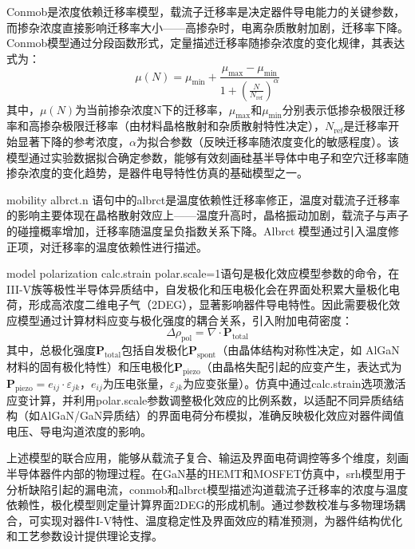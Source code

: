 \documentclass[
    oneside,                %
    fontset = win, %
  ]{njuthesis}
\begin{document}
Conmob是浓度依赖迁移率模型，载流子迁移率是决定器件导电能力的关键参数，而掺杂浓度直接影响迁移率大小——高掺杂时，电离杂质散射加剧，迁移率下降\cite{HighFieldTransportSemiconductors}。Conmob模型通过分段函数形式，定量描述迁移率随掺杂浓度的变化规律，其表达式为：
\begin{equation}
\mu(N) = \mu_{\text{min}} + \frac{\mu_{\text{max}} - \mu_{\text{min}}}{1 + \left(\frac{N}{N_{\text{ref}}}\right)^\alpha}
\end{equation}
其中，\(\mu(N)\)为当前掺杂浓度N下的迁移率，\(\mu_{\text{max}}\)和\(\mu_{\text{min}}\)分别表示低掺杂极限迁移率和高掺杂极限迁移率（由材料晶格散射和杂质散射特性决定），\(N_{\text{ref}}\)是迁移率开始显著下降的参考浓度，\(\alpha\)为拟合参数（反映迁移率随浓度变化的敏感程度）。该模型通过实验数据拟合确定参数，能够有效刻画硅基半导体中电子和空穴迁移率随掺杂浓度的变化趋势，是器件电导特性仿真的基础模型之一。

mobility albrct.n 语句中的albrct是温度依赖性迁移率修正，温度对载流子迁移率的影响主要体现在晶格散射效应上——温度升高时，晶格振动加剧，载流子与声子的碰撞概率增加，迁移率随温度呈负指数关系下降。Albrct 模型通过引入温度修正项，对迁移率的温度依赖性进行描述。

model polarization calc.strain polar.scale=1语句是极化效应模型参数的命令，在III-V族等极性半导体异质结中，自发极化和压电极化会在界面处积累大量极化电荷，形成高浓度二维电子气（2DEG），显著影响器件导电特性\cite{zhou2020polarization}。因此需要极化效应模型通过计算材料应变与极化强度的耦合关系，引入附加电荷密度：
\begin{equation}
\Delta\rho_{\text{pol}} = \nabla \cdot \mathbf{P}_{\text{total}}
\end{equation}
其中，总极化强度\(\mathbf{P}_{\text{total}}\)包括自发极化\(\mathbf{P}_{\text{spont}}\)（由晶体结构对称性决定，如 AlGaN 材料的固有极化特性）和压电极化\(\mathbf{P}_{\text{piezo}}\)（由晶格失配引起的应变产生，表达式为\(\mathbf{P}_{\text{piezo}} = e_{ij} \cdot \varepsilon_{jk}\)，\(e_{ij}\)为压电张量，\(\varepsilon_{jk}\)为应变张量）。仿真中通过calc.strain选项激活应变计算，并利用polar.scale参数调整极化效应的比例系数，以适配不同异质结结构（如AlGaN/GaN异质结）的界面电荷分布模拟，准确反映极化效应对器件阈值电压、导电沟道浓度的影响。

上述模型的联合应用，能够从载流子复合、输运及界面电荷调控等多个维度，刻画半导体器件内部的物理过程。在GaN基的HEMT和MOSFET仿真中，srh模型用于分析缺陷引起的漏电流，conmob和albrct模型描述沟道载流子迁移率的浓度与温度依赖性，极化模型则定量计算界面2DEG的形成机制。通过参数校准与多物理场耦合，可实现对器件I-V特性、温度稳定性及界面效应的精准预测，为器件结构优化和工艺参数设计提供理论支撑\cite{wong2023tcad}\cite{munir2006epilayer}。
\end{document}
